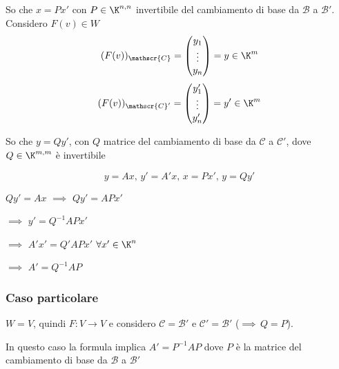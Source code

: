 So che $ x=P x' $ con $ P \in \K^{n,n} $ invertibile del cambiamento di base da $ \mathscr{B} $ a $ \mathscr{B}' $. Considero $ F(v) \in W $
\[
    (F(v))_{ \mathscr{C}}=\begin{pmatrix}
        y_1\\ \vdots \\ y_{n} 
    \end{pmatrix}= y \in \K^m
\]
\[
    (F(v))_{ \mathscr{C}'}=\begin{pmatrix}
        y_1'\\ \vdots \\ y_{n}' 
    \end{pmatrix}= y' \in \K^m
\]

So che $ y=Qy' $, con $ Q $ matrice del cambiamento di base da $ \mathscr{C} $ a $ \mathscr{C}' $, dove $ Q \in \K^{m,m} $ è invertibile

\[y=Ax,\, y'=A'x,\,x=Px',\,y=Qy'\]

$ Qy'=Ax $ $ \implies $ $ Qy'=APx' $ 

$\implies$ $ y'=Q^{-1}APx' $ 

$\implies$ $ A' x'=Q'APx' $ $ \forall x' \in \K^n $ 

$\implies$ $ A'=Q^{-1}AP $

\subsubsection{Caso particolare} $ W=V $, quindi $ F:V\to V $ e considero $ \mathscr{C}= \mathscr{B}'$ e $ \mathscr{C}' = \mathscr{B}'$ ($\implies\, Q=P$). 

In questo caso la formula implica $ A'=P^{-1}AP $ dove $ P $ è la matrice del cambiamento di base da $ \mathscr{B} $ a $ \mathscr{B}' $




